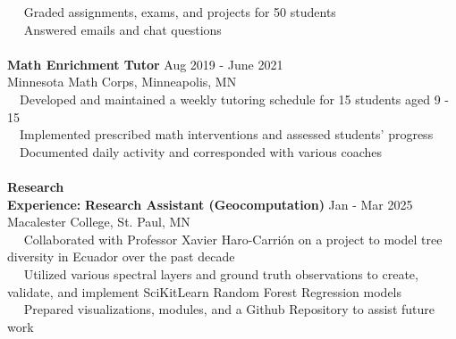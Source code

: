 \documentclass[letterpaper,12pt]{article}
\numberwithin{equation}{section}
\begin{document}
 \hspace*{1.2in} \textbullet ~~ Graded assignments, exams, and projects for 50 students\\
 \hspace*{1.2in} \textbullet ~~ Answered emails and chat questions
\\\\
\hspace*{1.16in}\textbf{Math Enrichment Tutor} \hspace*{2.85in} Aug 2019 - June 2021\\	
\hspace*{1.16in} Minnesota Math Corps, Minneapolis, MN \vspace*{.1cm} \\
\hspace*{1.2in} \textbullet ~~Developed and maintained a weekly tutoring schedule for 15 students aged 9 - 15 \\
\hspace*{1.2in} \textbullet ~~Implemented prescribed math interventions and assessed students' progress\\
\hspace*{1.2in} \textbullet ~~Documented daily activity and corresponded with various coaches\\
\\
\noindent\textbf{Research}\\
\noindent\textbf{Experience:}\hspace*{.16in}\textbf{ Research Assistant (Geocomputation)} \hspace*{2.in} Jan - Mar 2025\\
\hspace*{1.16in} Macalester College, St. Paul, MN \vspace*{.1cm}\\
\hspace*{1.2in} \textbullet ~~ Collaborated with Professor Xavier Haro-Carri\'on on a project to model tree diversity 
\hspace*{1.6in} in Ecuador over the past decade\\
\hspace*{1.2in} \textbullet ~~ Utilized various spectral layers and ground truth observations to create, validate, and 
\hspace*{1.6in} implement SciKitLearn Random Forest Regression models\\
\hspace*{1.2in} \textbullet ~~ Prepared visualizations, modules, and a Github Repository to assist future work
\end{document}
